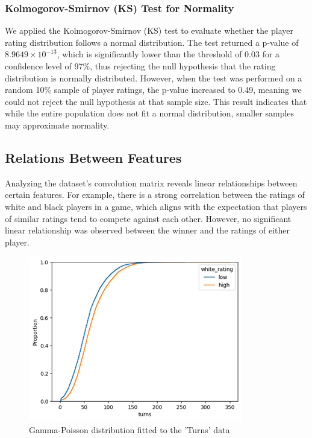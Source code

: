 \documentclass[conference]{IEEEtran}
\begin{document}
\subsubsection{Kolmogorov-Smirnov (KS) Test for Normality}
We applied the Kolmogorov-Smirnov (KS) test to evaluate whether the player rating distribution follows a normal distribution. The test returned a p-value of \(8.9649 \times 10^{-13}\), which is significantly lower than the threshold of \(0.03\) for a confidence level of 97\%, thus rejecting the null hypothesis that the rating distribution is normally distributed. However, when the test was performed on a random 10\% sample of player ratings, the p-value increased to 0.49, meaning we could not reject the null hypothesis at that sample size. This result indicates that while the entire population does not fit a normal distribution, smaller samples may approximate normality.

\subsection{Relations Between Features}
Analyzing the dataset’s convolution matrix reveals linear relationships between certain features. For example, there is a strong correlation between the ratings of white and black players in a game, which aligns with the expectation that players of similar ratings tend to compete against each other. However, no significant linear relationship was observed between the winner and the ratings of either player.

\begin{figure}[H]
    \centering
    \includegraphics[width=0.8\linewidth]{ratingecdf.png}
    \caption{Gamma-Poisson distribution fitted to the 'Turns' data}
    \label{fig:ecdf_plot}
\end{figure}
\end{document}
